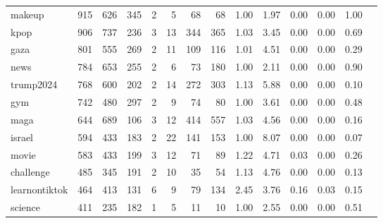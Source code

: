 \begin{tabular}{l|rrrrr|rrrrrrrr}
              makeup &    915 &    626 &                        345 &   2 &      5 &     68 &     68 & 1.00 &   1.97 &   0.00 &         0.00 &                                1.00 \\
                kpop &    906 &    737 &                        236 &   3 &     13 &    344 &    365 & 1.03 &   3.45 &   0.00 &         0.00 &                                0.69 \\
                gaza &    801 &    555 &                        269 &   2 &     11 &    109 &    116 & 1.01 &   4.51 &   0.00 &         0.00 &                                0.29 \\
                news &    784 &    653 &                        255 &   2 &      6 &     73 &    180 & 1.00 &   2.11 &   0.00 &         0.00 &                                0.90 \\
           trump2024 &    768 &    600 &                        202 &   2 &     14 &    272 &    303 & 1.13 &   5.88 &   0.00 &         0.00 &                                0.10 \\
                 gym &    742 &    480 &                        297 &   2 &      9 &     74 &     80 & 1.00 &   3.61 &   0.00 &         0.00 &                                0.48 \\
                maga &    644 &    689 &                        106 &   3 &     12 &    414 &    557 & 1.03 &   4.56 &   0.00 &         0.00 &                                0.16 \\
              israel &    594 &    433 &                        183 &   2 &     22 &    141 &    153 & 1.00 &   8.07 &   0.00 &         0.00 &                                0.07 \\
               movie &    583 &    433 &                        199 &   3 &     12 &     71 &     89 & 1.22 &   4.71 &   0.03 &         0.00 &                                0.26 \\
           challenge &    485 &    345 &                        191 &   2 &     10 &     35 &     54 & 1.13 &   4.76 &   0.00 &         0.00 &                                0.13 \\
       learnontiktok &    464 &    413 &                        131 &   6 &      9 &     79 &    134 & 2.45 &   3.76 &   0.16 &         0.03 &                                0.15 \\
             science &    411 &    235 &                        182 &   1 &      5 &     11 &     10 & 1.00 &   2.55 &   0.00 &         0.00 &                                0.51 \\

\end{tabular}
